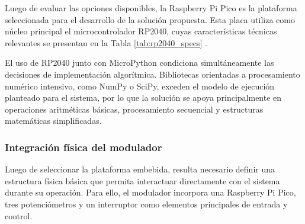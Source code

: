 Luego de evaluar las opciones disponibles, la Raspberry Pi Pico es la plataforma seleccionada para el desarrollo de la solución propuesta. Esta placa utiliza como núcleo principal el microcontrolador RP2040, cuyas características técnicas relevantes se presentan en la Tabla \ref{tab:rp2040_specs} \cite{raspberrypiPicoDocs}.

\begin{table}[H]
\centering
\caption{Características técnicas relevantes del RP2040.}
\label{tab:rp2040_specs}


\end{table}

El uso de RP2040 junto con MicroPython condiciona simultáneamente las decisiones de implementación algorítmica. Bibliotecas orientadas a procesamiento numérico intensivo, como NumPy o SciPy, exceden el modelo de ejecución planteado para el sistema, por lo que la solución se apoya principalmente en operaciones aritméticas básicas, procesamiento secuencial y estructuras matemáticas simplificadas.


\subsubsection{Integración física del modulador}

Luego de seleccionar la plataforma embebida, resulta necesario definir una estructura física básica que permita interactuar directamente con el sistema durante su operación. Para ello, el modulador incorpora una Raspberry Pi Pico, tres potenciómetros y un interruptor como elementos principales de entrada y control.


